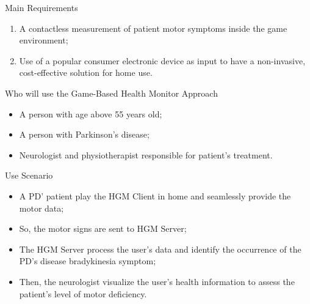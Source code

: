 \documentclass{beamer}
\begin{document}
\begin{frame}{Main Requirements}
    \begin{block}{}
		    \begin{enumerate}[<+->]
            \item A contactless measurement of patient motor symptoms inside the game environment;
						\item Use of a popular consumer electronic device as input to have a non-invasive, cost-effective solution for home use.
        \end{enumerate}
    \end{block}
\end{frame}


\begin{frame}{Who will use the Game-Based Health Monitor Approach}
    \begin{block}{}
        \begin{itemize}[<+->]
            \item A person with age above 55 years old;
            \item A person with Parkinson's disease;
            \item Neurologist and physiotherapist responsible for patient's treatment.
        \end{itemize}
    \end{block}
\end{frame}


\begin{frame}{Use Scenario}
   \begin{block}{}
      \begin{itemize}[<+->]
       \item A PD' patient play the HGM Client in home and seamlessly provide the motor data;
       \item So, the motor signs are sent to HGM Server;
       \item The HGM Server process the user's data and identify the occurrence of the PD's disease bradykinesia symptom;
       \item Then, the neurologist visualize the user's health information to assess the patient's level of motor deficiency.
      \end{itemize}
  \end{block}
\end{frame}
\end{document}
